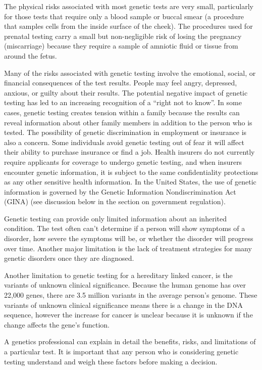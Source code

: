 The physical risks associated with most genetic tests are very small, particularly for those tests that require only a blood sample or buccal smear (a procedure that samples cells from the inside surface of the cheek). The procedures used for prenatal testing carry a small but non-negligible risk of losing the pregnancy (miscarriage) because they require a sample of amniotic fluid or tissue from around the fetus.

Many of the risks associated with genetic testing involve the emotional, social, or financial consequences of the test results. People may feel angry, depressed, anxious, or guilty about their results. The potential negative impact of genetic testing has led to an increasing recognition of a ``right not to know''. In some cases, genetic testing creates tension within a family because the results can reveal information about other family members in addition to the person who is tested. The possibility of genetic discrimination in employment or insurance is also a concern. Some individuals avoid genetic testing out of fear it will affect their ability to purchase insurance or find a job. Health insurers do not currently require applicants for coverage to undergo genetic testing, and when insurers encounter genetic information, it is subject to the same confidentiality protections as any other sensitive health information. In the United States, the use of genetic information is governed by the Genetic Information Nondiscrimination Act (GINA) (see discussion below in the section on government regulation).

Genetic testing can provide only limited information about an inherited condition. The test often can't determine if a person will show symptoms of a disorder, how severe the symptoms will be, or whether the disorder will progress over time. Another major limitation is the lack of treatment strategies for many genetic disorders once they are diagnosed.

Another limitation to genetic testing for a hereditary linked cancer, is the variants of unknown clinical significance. Because the human genome has over 22,000 genes, there are 3.5 million variants in the average person's genome. These variants of unknown clinical significance means there is a change in the DNA sequence, however the increase for cancer is unclear because it is unknown if the change affects the gene's function.

A genetics professional can explain in detail the benefits, risks, and limitations of a particular test. It is important that any person who is considering genetic testing understand and weigh these factors before making a decision.

